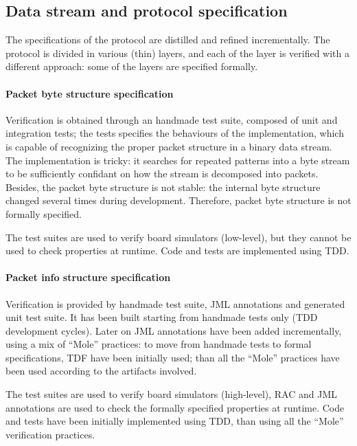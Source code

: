 \documentclass{article}
\begin{document}
\subsection{Data stream and protocol specification}
\label{subsec:data_stream_and_protocol_specification}

The specifications of the protocol are distilled and refined incrementally.
The protocol is divided in various (thin) layers, and each of the layer is verified with a different approach: some of the layers are specified formally. 

\paragraph*{Packet byte structure specification}

Verification is obtained through an handmade test suite, composed of unit and integration tests; the tests specifies the behaviours of the implementation, which is capable of recognizing the proper packet structure in a binary data stream. 
The implementation is tricky: it searches for repeated patterns into a byte stream to be sufficiently confidant on how the stream is decomposed into packets.
Besides, the packet byte structure is not stable: the internal byte structure changed several times during development.
Therefore, packet byte structure is not formally specified.

The test suites are used to verify board simulators (low-level), but they cannot be used to check properties at runtime.
Code and tests are implemented using TDD.

\paragraph*{Packet info structure specification}

Verification is provided by handmade test suite, JML annotations and generated unit test suite. 
It has been built starting from handmade tests only (TDD development cycles).
Later on JML annotations have been added incrementally, using a mix of ``Mole'' practices: to move from handmade tests to formal specifications, TDF have been initially used; than all the ``Mole'' practices have been used according to the artifacts involved.

The test suites are used to verify board simulators (high-level), RAC and JML annotations are used to check the formally specified properties at runtime.
Code and tests have been initially implemented using TDD, than using all the ``Mole'' verification practices.
\end{document}
